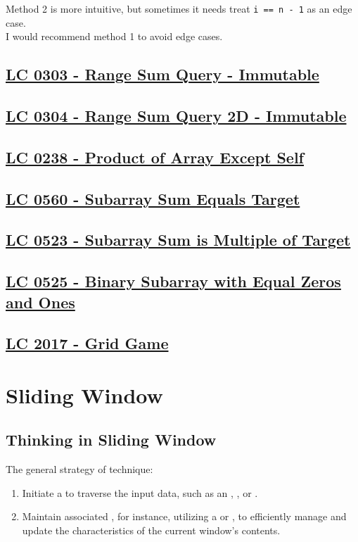 Method 2 is more intuitive, but sometimes it needs treat {\colorbox{CodeBackground}{\lstinline|i == n - 1|}} as an edge case.\\

I would recommend method 1 to avoid edge cases.

\subsection{\hyperref[lc0303]{LC 0303 - Range Sum Query - Immutable}}
\subsection{\hyperref[lc0304]{LC 0304 - Range Sum Query 2D - Immutable}}
\subsection{\hyperref[lc0238]{LC 0238 - Product of Array Except Self}}
\subsection{\hyperref[lc0560]{LC 0560 - Subarray Sum Equals Target}}
\subsection{\hyperref[lc0523]{LC 0523 - Subarray Sum is Multiple of Target}}
\subsection{\hyperref[lc0525]{LC 0525 - Binary Subarray with Equal Zeros and Ones}}
\subsection{\hyperref[lc2017]{LC 2017 - Grid Game}}

\section{Sliding Window}\label{sec:sliding_window}
\subsection{Thinking in Sliding Window}
The general strategy of {\color{blue}{sliding window}} technique:
\begin{enumerate}
\item Initiate a {\color{blue}{sliding window}} to traverse the input data, such as an {\color{blue}{array}}, {\color{blue}{string}}, or {\color{blue}{linked list}}.
\item Maintain associated {\color{blue}{state information}}, for instance, utilizing a {\color{blue}{hash set}} or {\color{blue}{hash map}}, to efficiently manage and update the characteristics of the current window's contents.
\end{enumerate}

